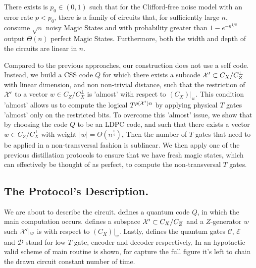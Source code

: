 \begin{theorem}
  \label{theorem:main}
There exists is $p_0 \in (0,1)$ such that for the Clifford-free noise model with an error rate $p < p_{0}$, there is a family of circuits that, for sufficiently large $n$, consume $\sqrt{n}$ noisy Magic States and with  probability greater than $1 - e^{-n^{1/8}}$ output $\Theta(n)$ perfect Magic States. Furthermore, both the width and depth of the circuits are linear in $n$.
\end{theorem}
Compared to the previous approaches, our construction does not use a self \trig code. Instead, we build a CSS code $Q$ for which there exists a subcode $\mathcal{X}^\prime \subset C_{X}/C_{Z}^\perp$ with linear dimension, and non non-trivial distance, such that the restriction of $\mathcal{X}^\prime$ to a vector $w \in C_{Z}/C_{X}^\perp$ is 'almost' \trig with respect to $(C_{X})|_{w}$. This condition 'almost' allows us to compute the logical $T^{\rho(\mathcal{X}^\prime)n}$ by applying physical $T$ gates 'almost' only on the restricted bits. To overcome this 'almost' issue, we show that by choosing the code $Q$ to be an LDPC code, and such that there exists a vector $w\in C_{Z}/C_{X}^\perp$ with weight $|w| = \Theta(n^\frac{1}{4})$, Then the number of $T$ gates that need to be applied in a non-transversal fashion is sublinear. We then apply one of the previous distillation protocols to ensure that we have fresh magic states, which can effectively be thought of as perfect, to compute the non-transversal $T$ gates.

\subsection{The Protocol's Description.} 
We are about to describe the circuit.  defines a quantum code $Q$, in which the main computation occurs.  defines a subspace $\mathcal{X}^\prime \subset C_{X}/C_{Z}^\perp$ and a $Z$-generator $w$ such $\mathcal{X}^\prime|_{w}$ is \trig with respect to $(C_{X})|_{w}$. Lastly,  defines the quantum gates $\mathcal{C}$, $\mathcal{E}$ and $\mathcal{D}$ stand for low-$T$ gate, encoder and decoder respectively, In  an hypotactic valid scheme of main routine is shown, for capture the full figure it's left to chain the drawn circuit constant number of time. 

